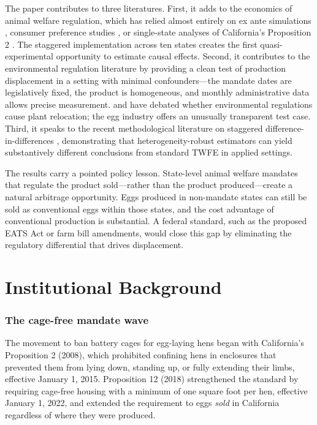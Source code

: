 \documentclass[12pt]{article}
\begin{document}
The paper contributes to three literatures. First, it adds to the economics of animal welfare regulation, which has relied almost entirely on ex ante simulations \citep{malone2016costly, sumner2011economic}, consumer preference studies \citep{lusk2011welfare, norwood2011compassion}, or single-state analyses of California's Proposition 2 \citep{allender2010consumer, lusk2019looking, anderson2019egg}. The staggered implementation across ten states creates the first quasi-experimental opportunity to estimate causal effects. Second, it contributes to the environmental regulation literature by providing a clean test of production displacement in a setting with minimal confounders---the mandate dates are legislatively fixed, the product is homogeneous, and monthly administrative data allows precise measurement. \citet{greenstone2012does} and \citet{jaffe1995environmental} have debated whether environmental regulations cause plant relocation; the egg industry offers an unusually transparent test case. Third, it speaks to the recent methodological literature on staggered difference-in-differences \citep{goodman2021difference, sun2021estimating, de2020two}, demonstrating that heterogeneity-robust estimators can yield substantively different conclusions from standard TWFE in applied settings.

The results carry a pointed policy lesson. State-level animal welfare mandates that regulate the product sold---rather than the product produced---create a natural arbitrage opportunity. Eggs produced in non-mandate states can still be sold as conventional eggs within those states, and the cost advantage of conventional production is substantial. A federal standard, such as the proposed EATS Act or farm bill amendments, would close this gap by eliminating the regulatory differential that drives displacement.


\section{Institutional Background}

\subsubsection*{The cage-free mandate wave} The movement to ban battery cages for egg-laying hens began with California's Proposition 2 (2008), which prohibited confining hens in enclosures that prevented them from lying down, standing up, or fully extending their limbs, effective January 1, 2015. Proposition 12 (2018) strengthened the standard by requiring cage-free housing with a minimum of one square foot per hen, effective January 1, 2022, and extended the requirement to eggs \textit{sold} in California regardless of where they were produced.
\end{document}
